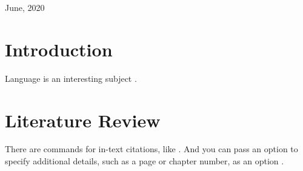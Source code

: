 \documentclass[a4paper,UTF8, 12pt]{article}
\begin{document}
\begin{titlepage}
	
	
	\vfill\vfill\vfill %
	
	{\large June, 2020} %
	
	
	
	
	\vfill %
	
\end{titlepage}


%
\newpage
\headheight 1.5cm %
\pagestyle{fancy}


   \section{Introduction}
    Language is an interesting subject \citep{TM83}.
   \section{Literature Review}
   There are commands for in-text citations, like \citet{GMP81}. And you can pass an option to specify additional details, such as a page or chapter number, as an option \citep[p. 130]{Ful83}.
\end{document}
